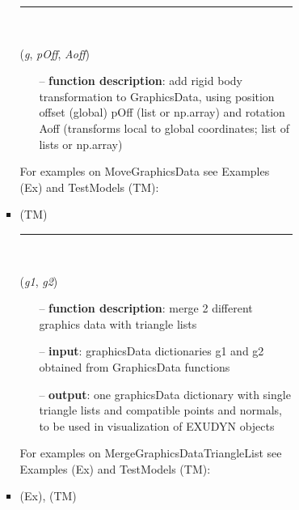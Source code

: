 \begin{itemize}[leftmargin=1.4cm]
\begin{itemize}[leftmargin=0.5cm]
\begin{itemize}[leftmargin=1.4cm]
\begin{itemize}[leftmargin=1.4cm]
\begin{itemize}[leftmargin=0.5cm]
\begin{itemize}[leftmargin=1.4cm]
\begin{itemize}[leftmargin=0.5cm]
%
\noindent\rule{8cm}{0.75pt}\vspace{1pt} \\ 
\begin{flushleft}
\label{sec:graphicsDataUtilities:MoveGraphicsData}
({\it g}, {\it pOff}, {\it Aoff})
\end{flushleft}
\setlength{\itemindent}{0.7cm}
\begin{itemize}[leftmargin=0.7cm]
  \item[--]  {\bf function description}: add rigid body transformation to GraphicsData, using position offset (global) pOff (list or np.array) and rotation Aoff (transforms local to global coordinates; list of lists or np.array)\vspace{12pt}\end{itemize}
%
%
\noindent For examples on MoveGraphicsData see Examples (Ex) and TestModels (TM):
\bi
 \item \footnotesize {} (TM)\ei

%
\noindent\rule{8cm}{0.75pt}\vspace{1pt} \\ 
\begin{flushleft}
\label{sec:graphicsDataUtilities:MergeGraphicsDataTriangleList}
({\it g1}, {\it g2})
\end{flushleft}
\setlength{\itemindent}{0.7cm}
\begin{itemize}[leftmargin=0.7cm]
  \item[--]  {\bf function description}: merge 2 different graphics data with triangle lists  \item[--]  {\bf input}: graphicsData dictionaries g1 and g2 obtained from GraphicsData functions  \item[--]  {\bf output}: one graphicsData dictionary with single triangle lists and compatible points and normals, to be used in visualization of EXUDYN objects\vspace{12pt}\end{itemize}
%
%
\noindent For examples on MergeGraphicsDataTriangleList see Examples (Ex) and TestModels (TM):
\bi
 \item \footnotesize {} (Ex), 
 (TM)\ei


\end{itemize}
\end{itemize}
\end{itemize}
\end{itemize}
\end{itemize}
\end{itemize}
\end{itemize}
